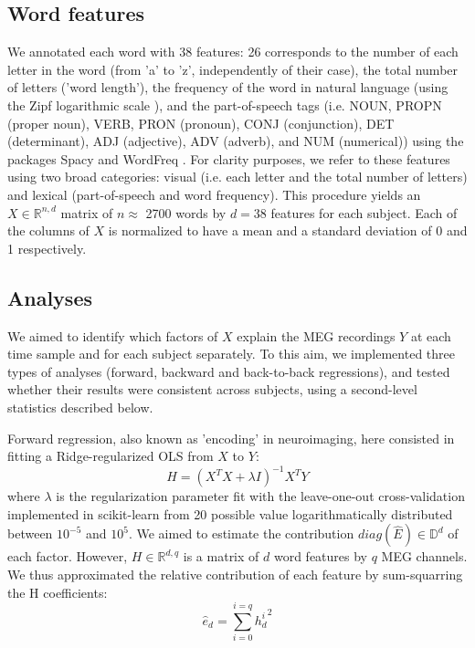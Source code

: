 \subsection{Word features}
We annotated each word with 38 features: 26 corresponds to the number of each letter in the word (from 'a' to 'z', independently of their case), the total number of letters ('word length'), the frequency of the word in natural language (using the Zipf logarithmic scale \cite{marc_brysbaert}), and the part-of-speech tags (i.e. NOUN, PROPN (proper noun), VERB, PRON (pronoun), CONJ (conjunction), DET (determinant), ADJ (adjective), ADV (adverb), and NUM (numerical)) using the packages Spacy \cite{spacy} and WordFreq \cite{speer}. For clarity purposes, we refer to these features using two broad categories: visual (i.e. each letter and the total number of letters) and lexical (part-of-speech and word frequency).
This procedure yields an $X \in \mathbb{R}^{n, d}$ matrix of $n\approx$ 2700 words by $d=38$ features for each subject. Each of the columns of $X$ is normalized to have a mean and a standard deviation of 0 and 1 respectively.

\subsection{Analyses}
We aimed to identify which factors of $X$ explain the MEG recordings $Y$ at each time sample and for each subject separately. To this aim, we implemented three types of analyses (forward, backward and back-to-back regressions), and tested whether their results were consistent across subjects, using a second-level statistics described below.

Forward regression, also known as 'encoding' in neuroimaging, here consisted in fitting a Ridge-regularized OLS from $X$ to $Y$:
\begin{equation}
H = (X^{T}X+\lambda I)^{-1} X^{T}Y
\end{equation}
where $\lambda$ is the regularization parameter fit with the leave-one-out cross-validation implemented in scikit-learn \cite{sklearn} from 20 possible value logarithmatically distributed between $10^{-5}$ and $10^5$. We aimed to estimate the contribution $diag(\hat E) \in\mathbb{D}^{d} $ of each factor. However, $H\in\mathbb{R}^{d, q}$ is a matrix of $d$ word features by $q$ MEG channels. We thus approximated the relative contribution of each feature by sum-squarring the H coefficients:
\begin{equation}
\hat e_d = \sum_{i=0}^{i=q} {h_d^i}^2
\end{equation}


